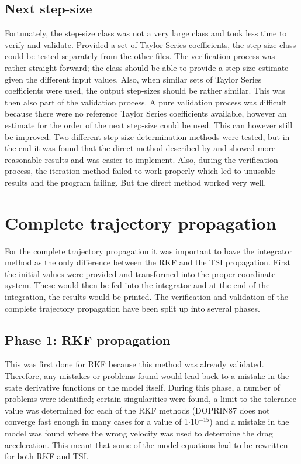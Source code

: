 \subsection{Next step-size}
\label{subsec:nextStepSizeverval}
Fortunately, the step-size class was not a very large class and took less time to verify and validate. Provided a set of Taylor Series coefficients, the step-size class could be tested separately from the other files. The verification process was rather straight forward; the class should be able to provide a step-size estimate given the different input values. Also, when similar sets of Taylor Series coefficients were used, the output step-sizes should be rather similar. This was then also part of the validation process. A pure validation process was difficult because there were no reference Taylor Series coefficients available, however an estimate for the order of the next step-size could be used. This can however still be improved. Two different step-size determination methods were tested, but in the end it was found that the direct method described by \cite{scott2008high} and \cite{bergsma2015application} showed more reasonable results and was easier to implement. Also, during the verification process, the iteration method failed to work properly which led to unusable results and the program failing. But the direct method worked very well.




\section{Complete trajectory propagation}
\label{sec:propverval}
For the complete trajectory propagation it was important to have the integrator method as the only difference between the \ac{RKF} and the \ac{TSI} propagation. First the initial values were provided and transformed into the proper coordinate system. These would then be fed into the integrator and at the end of the integration, the results would be printed. The verification and validation of the complete trajectory propagation have been split up into several phases.


\subsection{Phase 1: \ac{RKF} propagation}
\label{subsec:phase1com}
This was first done for \ac{RKF} because this method was already validated. Therefore, any mistakes or problems found would lead back to a mistake in the state derivative functions or the model itself.
During this phase, a number of problems were identified; certain singularities were found, a limit to the tolerance value was determined for each of the \ac{RKF} methods (\ac{DOPRIN87} does not converge fast enough in many cases for a value of 1$\cdot$10$^{-15}$) and a mistake in the model was found where the wrong velocity was used to determine the drag acceleration. This meant that some of the model equations had to be rewritten for both \ac{RKF} and \ac{TSI}. 

